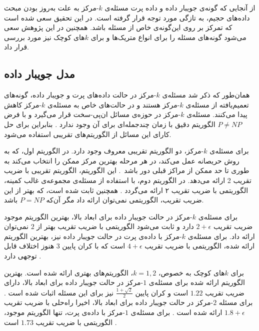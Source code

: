 از آنجایی که گونه‌ی جویبار داده و داده پرت مسئله‌ی $k$-مرکز به علت به‌روز بودن مبحث داده‌های حجیم، به تازگی مورد توجه قرار گرفته است.
در این تحقیق سعی شده است که تمرکز بر روی این‌گونه‌ی خاص از مسئله باشد.
همچنین در این پژوهش سعی می‌شود گونه‌های مسئله را برای انواع متریک‌ها و برای $k$های کوچک نیز مورد بررسی قرار داد. 

\subsection{مدل جویبار داده}

همان‌طور که ذکر شد مسئله‌ی $k$-مرکز در حالت داده‌های پرت و جویبار داده، گونه‌های تعمیم‌یافته از مسئله‌ی $k$-مرکز هستند و در حالت‌های خاص به مسئله‌ی $k$-مرکز کاهش پیدا می‌کنند.
مسئله‌ی $k$-مرکز در حوزه‌ی مسائل ان‌پی-سخت قرار می‌گیرد و با فرض $P \neq NP$ الگوریتم دقیق با زمان چندجمله‌ای برای آن وجود ندارد .
بنابراین برای حل کارای این مسائل از الگوریتم‌های تقریبی استفاده می‌شود.

برای مسئله‌ی $k$-مرکز، دو الگوریتم تقریبی معروف وجود دارد.
در الگوریتم اول، که به روش حریصانه عمل می‌کند، در هر مرحله بهترین مرکز ممکن را انتخاب می‌کند به طوری تا حد ممکن از مراکز قبلی دور باشد~.
این الگوریتم، الگوریتم تقریبی با ضریب تقریب 2 ارائه می‌دهد.
در الگوریتم دوم، با استفاده از مسئله‌ی مجموعه‌ی غالب کمینه، الگوریتمی با ضریب تقریب ۲ ارائه می‌گردد .
همچنین ثابت شده است، که بهتر از این ضریب تقریب، الگوریتمی نمی‌توان ارائه داد مگر آن‌که $P = NP$ باشد.

برای مسئله‌ی $k$-مرکز در حالت جویبار داده برای ابعاد بالا، بهترین الگوریتم موجود ضریب تقریب $2 + \epsilon$ دارد  و ثابت می‌شود الگوریتمی با ضریب تقریب بهتر از $2$ نمی‌توان ارائه داد. برای مسئله‌ی $k$-مرکز با داده‌ی پرت در حالت جویبار داده نیز، بهترین الگوریتم ارائه شده، الگوریتمی با ضریب تقریب $4 + \epsilon$ است که با کران پایین $3$ هنوز اختلاف قابل توجهی دارد . 

برای $k$های کوچک به خصوص، $k =1, 2$، الگوریتم‌های بهتری ارائه شده است. بهترین الگوریتم ارائه شده برای مسئله‌ی $1$-مرکز در حالت جویبار داده برای ابعاد بالا، دارای ضریب تقریب $1.22$ است و کران پایین $\frac{1 + \sqrt{2}}{2}$ نیز برای این مسئله اثبات شده است . برای مسئله $2$-مرکز در حالت جویبار داده برای ابعاد بالا، اخیرا راه‌حلی با ضریب تقریب $1.8 + \epsilon$ ارائه شده است . برای مسئله‌ی $1$-مرکز با داده‌ی پرت، تنها الگوریتم موجود، الگوریتمی با ضریب تقریب $1.73$ است .

